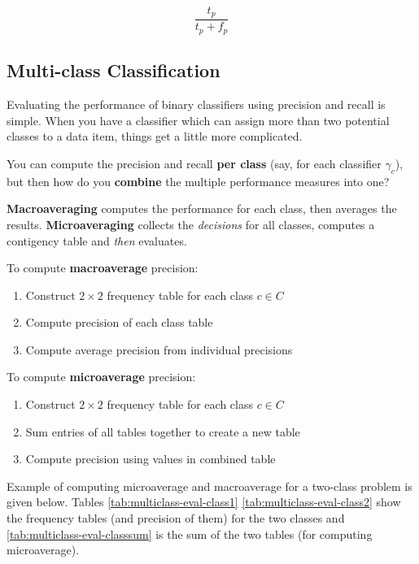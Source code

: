\documentclass{article}
\begin{document}
\begin{equation}
	\frac{t_p}{t_p + f_p}
	\label{eq:bin-classify-precision}
\end{equation}

\subsection{Multi-class Classification}
\label{sec:multiclass-classifier-evaluation}

Evaluating the performance of binary classifiers using precision and recall is simple. When you have a classifier which can assign more than two potential classes to a data item, things get a little more complicated.

You can compute the precision and recall \textbf{per class} (say, for each classifier $\gamma_c$), but then how do you \textbf{combine} the multiple performance measures into one?

\textbf{Macroaveraging} computes the performance for each class, then averages the results. \textbf{Microaveraging} collects the \textit{decisions} for all classes, computes a contigency table and \textit{then} evaluates.

To compute \textbf{macroaverage} precision:
\begin{enumerate}
	\item Construct $2 \times 2$ frequency table for each class $c \in C$
	\item Compute precision of each class table
	\item Compute average precision from individual precisions
\end{enumerate}

To compute \textbf{microaverage} precision:
\begin{enumerate}
	\item Construct $2 \times 2$ frequency table for each class $c \in C$
	\item Sum entries of all tables together to create a new table
	\item Compute precision using values in combined table
\end{enumerate}

Example of computing microaverage and macroaverage for a two-class problem is given below. Tables \ref{tab:multiclass-eval-class1} \ref{tab:multiclass-eval-class2} show the frequency tables (and precision of them) for the two classes and \ref{tab:multiclass-eval-classsum} is the sum of the two tables (for computing microaverage).
\end{document}
